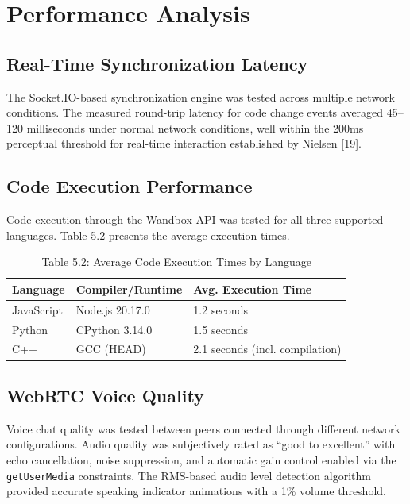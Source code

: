 \documentclass[12pt,a4paper,oneside]{report}
\newenvironment{reporttable}{%
  \small\singlespacing
}{%
  \doublespacing
}
\begin{document}
\section{Performance Analysis}

\subsection{Real-Time Synchronization Latency}

The Socket.IO-based synchronization engine was tested across multiple network conditions. The measured round-trip latency for code change events averaged 45--120 milliseconds under normal network conditions, well within the 200ms perceptual threshold for real-time interaction established by Nielsen [19].

\subsection{Code Execution Performance}

Code execution through the Wandbox API was tested for all three supported languages. Table 5.2 presents the average execution times.

\begin{table}[H]
\centering
\caption{Table 5.2: Average Code Execution Times by Language}
\label{tab:exectime}
\begin{reporttable}
\begin{tabular}{@{} l l l @{}}
\toprule
\textbf{Language} & \textbf{Compiler/Runtime} & \textbf{Avg. Execution Time} \\
\midrule
JavaScript & Node.js 20.17.0 & 1.2 seconds \\
Python & CPython 3.14.0 & 1.5 seconds \\
C++ & GCC (HEAD) & 2.1 seconds (incl. compilation) \\
\bottomrule
\end{tabular}
\end{reporttable}
\end{table}

\subsection{WebRTC Voice Quality}

Voice chat quality was tested between peers connected through different network configurations. Audio quality was subjectively rated as ``good to excellent'' with echo cancellation, noise suppression, and automatic gain control enabled via the \texttt{getUserMedia} constraints. The RMS-based audio level detection algorithm provided accurate speaking indicator animations with a 1\% volume threshold.
\end{document}

